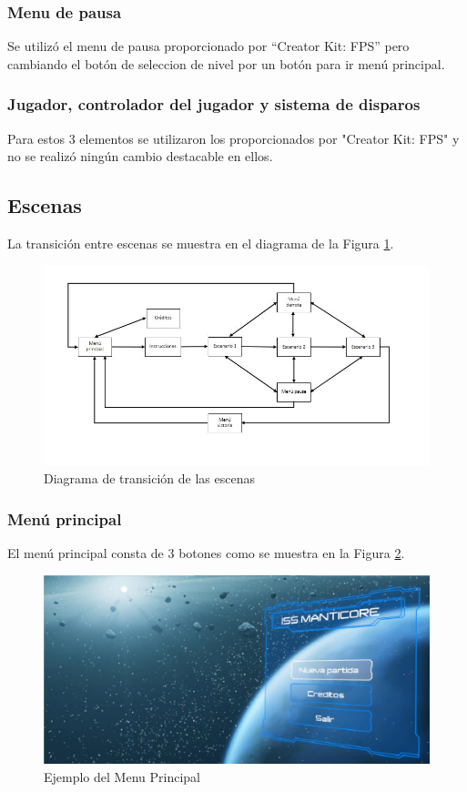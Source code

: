 \subsubsection{Menu de pausa}
Se utilizó el menu de pausa proporcionado por ``Creator Kit: FPS'' pero cambiando el botón de seleccion de nivel por un botón para ir menú principal.

\subsubsection{Jugador, controlador del jugador y sistema de disparos}
Para estos 3 elementos se utilizaron los proporcionados por "Creator Kit: FPS" y no se realizó ningún cambio destacable en ellos.

\subsection{Escenas}

La transición entre escenas se muestra en el diagrama de la Figura \ref{fig:TrasicionEscenas3D}. 

\begin{figure}[H]
	\centering
	\includegraphics[scale=0.75]{imagenes/transicionEscenas3D.png}
	\caption{\label{fig:TrasicionEscenas3D}Diagrama de transición de las escenas}
\end{figure}

\subsubsection{Menú principal}
El menú principal consta de 3 botones como se muestra en la Figura \ref{fig:MenuPrincipal3D1}.
\begin{figure}[H]
	\centering
	\includegraphics[scale=0.35]{imagenes/MenuPrincipal3D1.png}
	\caption{\label{fig:MenuPrincipal3D1}Ejemplo del Menu Principal}
\end{figure}

